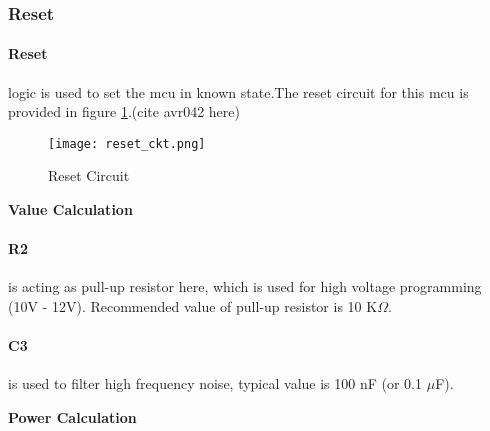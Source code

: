 
\subsubsection{Reset}

	\paragraph{Reset}
	logic is used to set the \gls{mcu} in known state.The reset circuit for this \gls{mcu} is provided in figure \ref{fig:reset_circuit}.(cite avr042 here)
	
	\begin{figure}[H]
		\caption{Reset Circuit}
		\label{fig:reset_circuit}
		\texttt{[image: reset\_ckt.png]}
	\end{figure}
	
	\textbf{Value Calculation}	
	\paragraph{R2}
	is acting as pull-up resistor here, which is used for high voltage programming (10V - 12V). Recommended value of pull-up resistor is 10 K$\Omega$.
	
	\paragraph{C3} 
	is used to filter high frequency noise, typical value is 100 nF (or 0.1 $\mu$F).
	
	\textbf{Power Calculation}
	
